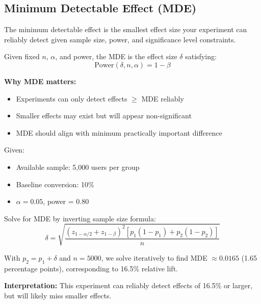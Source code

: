 \subsection{Minimum Detectable Effect (MDE)}

The minimum detectable effect is the smallest effect size your experiment can reliably detect given sample size, power, and significance level constraints.

\begin{definition}
Given fixed $n$, $\alpha$, and power, the MDE is the effect size $\delta$ satisfying:
\begin{equation}
\text{Power}(\delta, n, \alpha) = 1 - \beta
\end{equation}
\end{definition}

\textbf{Why MDE matters:}
\begin{itemize}
    \item Experiments can only detect effects $\geq$ MDE reliably
    \item Smaller effects may exist but will appear non-significant
    \item MDE should align with minimum practically important difference
\end{itemize}

\begin{example}
Given:
\begin{itemize}
    \item Available sample: 5,000 users per group
    \item Baseline conversion: 10\%
    \item $\alpha = 0.05$, power = 0.80
\end{itemize}

Solve for MDE by inverting sample size formula:
\begin{equation}
\delta = \sqrt{\frac{(z_{1-\alpha/2} + z_{1-\beta})^2 [p_1(1-p_1) + p_2(1-p_2)]}{n}}
\end{equation}

With $p_2 = p_1 + \delta$ and $n = 5000$, we solve iteratively to find MDE $\approx 0.0165$ (1.65 percentage points), corresponding to 16.5\% relative lift.

\textbf{Interpretation:} This experiment can reliably detect effects of 16.5\% or larger, but will likely miss smaller effects.
\end{example}

